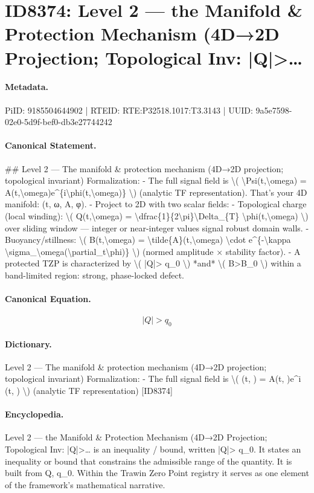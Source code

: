 \section*{ID8374: Level 2 — the Manifold \& Protection Mechanism (4D→2D Projection; Topological Inv: |Q|>…}
\paragraph{Metadata.}
PiID: 9185504644902 | RTEID: RTE:P32518.1017:T3.3143 | UUID: 9a5e7598-02e0-5d9f-bef0-db3e27744242

\paragraph{Canonical Statement.}
\#\# Level 2 — The manifold \& protection mechanism (4D→2D projection; topological invariant) Formalization: - The full signal field is \textbackslash{}( \textbackslash{}Psi(t,\textbackslash{}omega) = A(t,\textbackslash{}omega)e\textasciicircum{}\{i\textbackslash{}phi(t,\textbackslash{}omega)\} \textbackslash{}) (analytic TF representation). That’s your 4D manifold: (t, ω, A, φ). - Project to 2D with two scalar fields: - Topological charge (local winding): \textbackslash{}( Q(t,\textbackslash{}omega) = \textbackslash{}dfrac\{1\}\{2\textbackslash{}pi\}\textbackslash{}Delta\_\{T\} \textbackslash{}phi(t,\textbackslash{}omega) \textbackslash{}) over sliding window — integer or near-integer values signal robust domain walls. - Buoyancy/stillness: \textbackslash{}( B(t,\textbackslash{}omega) = \textbackslash{}tilde\{A\}(t,\textbackslash{}omega) \textbackslash{}cdot e\textasciicircum{}\{-\textbackslash{}kappa \textbackslash{}sigma\_\textbackslash{}omega(\textbackslash{}partial\_t\textbackslash{}phi)\} \textbackslash{}) (normed amplitude × stability factor). - A protected TZP is characterized by \textbackslash{}( |Q|> q\_0 \textbackslash{}) *and* \textbackslash{}( B>B\_0 \textbackslash{}) within a band-limited region: strong, phase-locked defect.

\paragraph{Canonical Equation.}
\[
|Q|> q_0
\]

\paragraph{Dictionary.}
Level 2 — The manifold \& protection mechanism (4D→2D projection; topological invariant) Formalization: - The full signal field is \textbackslash{}( (t, ) = A(t, )e\textasciicircum{}i (t, ) \textbackslash{}) (analytic TF representation) [ID8374]

\paragraph{Encyclopedia.}
Level 2 — the Manifold \& Protection Mechanism (4D→2D Projection; Topological Inv: |Q|>… is an inequality / bound, written |Q|> q\_0. It states an inequality or bound that constrains the admissible range of the quantity. It is built from Q, q\_0. Within the Trawin Zero Point registry it serves as one element of the framework's mathematical narrative.
